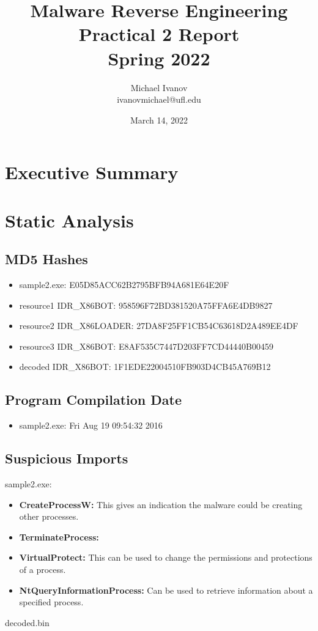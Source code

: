 \documentclass{article}
\title{Malware Reverse Engineering \\
Practical 2 Report \\
Spring 2022}
\author{Michael Ivanov \\
ivanovmichael@ufl.edu}
\date{March 14, 2022}
\begin{document}
    \maketitle
    \pagebreak
    \section{Executive Summary}
    \pagebreak
    \section{Static Analysis}

    \subsection{MD5 Hashes}
    \begin{itemize}
        \item sample2.exe: E05D85ACC62B2795BFB94A681E64E20F
        \item resource1 IDR{\_}X86BOT: 958596F72BD381520A75FFA6E4DB9827
        \item resource2 IDR{\_}X86LOADER: 27DA8F25FF1CB54C63618D2A489EE4DF
        \item resource3 IDR{\_}X86BOT: E8AF535C7447D203FF7CD44440B00459
        \item decoded IDR{\_}X86BOT: 1F1EDE22004510FB903D4CB45A769B12
    \end{itemize}

    \subsection{Program Compilation Date}
    \begin{itemize}
        \item sample2.exe: Fri Aug 19 09:54:32 2016
    \end{itemize}

    \subsection{Suspicious Imports}
    sample2.exe:
    \begin{itemize}
        \item \textbf{CreateProcessW:} This gives an indication the malware could be creating other processes.
        \item \textbf{TerminateProcess:}
        \item \textbf{VirtualProtect:} This can be used to change the permissions and protections of a process.
        \item \textbf{NtQueryInformationProcess:} Can be used to retrieve information about a specified process.
    \end{itemize}
    decoded.bin
\end{document}
